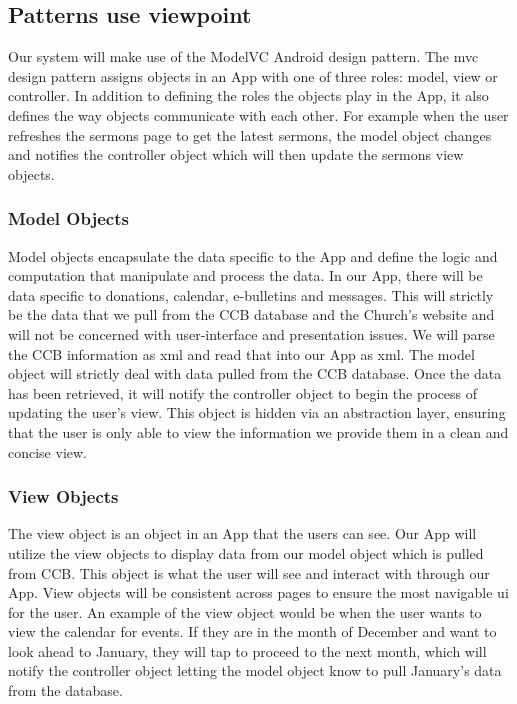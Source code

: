 \documentclass[letterpaper,10pt,draftclsnofoot,onecolumn,titlepage]{IEEEtran}
\begin{document}
		\subsection{Patterns use viewpoint}
			Our system will make use of the \gls{ModelVC} \gls{Android} design pattern.
			The \gls{mvc} design pattern assigns objects in an \gls{App} with one of three roles: model, view or controller.
			In addition to defining the roles the objects play in the \gls{App}, it also defines the way objects communicate with each other.
			For example when the user refreshes the sermons page to get the latest sermons, the model object changes and notifies the controller object which will then update the sermons view objects.

			\subsubsection{Model Objects}
				Model objects encapsulate the data specific to the \gls{App} and define the logic and computation that manipulate and process the data.
				In our \gls{App}, there will be data specific to donations, calendar, e-bulletins and messages.
				This will strictly be the data that we pull from the CCB database and the Church's website and will not be concerned with user-interface and presentation issues.
				We will parse the CCB information as \gls{xml} and read that into our \gls{App} as \gls{xml}.
				The model object will strictly deal with data pulled from the CCB database.
				Once the data has been retrieved, it will notify the controller object to begin the process of updating the user's view.
				This object is hidden via an abstraction layer, ensuring that the user is only able to view the information we provide them in a clean and concise view.

			\subsubsection{View Objects}
				The view object is an object in an \gls{App} that the users can see.
				Our \gls{App} will utilize the view objects to display data from our model object which is pulled from CCB.
				This object is what the user will see and interact with through our \gls{App}.
				View objects will be consistent across pages to ensure the most navigable \gls{ui} for the user.
				An example of the view object would be when the user wants to view the calendar for events.
				If they are in the month of December and want to look ahead to January, they will tap to proceed to the next month, which will notify the controller object letting the model object know to pull January's data from the database.
\end{document}

